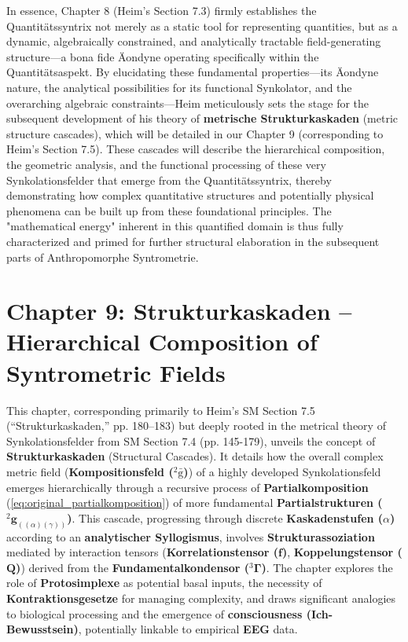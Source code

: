 \documentclass[12pt]{article}
\newcommand{\q}[1]{\enquote{#1}}
\newcommand{\kompositionsfeld}{{}^2\bar{\mathrm{g}}}
\newcommand{\partialstruktur}[1]{{}^2\mathbf{g}_{(#1)}}
\newcommand{\fundamentalkondensor}{{}^3\bm{\Gamma}}
\newcommand{\korrelationstensor}{\mathbf{f}}
\newcommand{\koppelungstensor}{\mathbf{Q}}
\newcommand{\kaskadenstufe}{\alpha}
\begin{document}
In essence, Chapter 8 (Heim's Section 7.3) firmly establishes the Quantitätssyntrix not merely as a static tool for representing quantities, but as a dynamic, algebraically constrained, and analytically tractable field-generating structure—a bona fide Äondyne operating specifically within the Quantitätsaspekt. By elucidating these fundamental properties—its Äondyne nature, the analytical possibilities for its functional Synkolator, and the overarching algebraic constraints—Heim meticulously sets the stage for the subsequent development of his theory of \textbf{metrische Strukturkaskaden} (metric structure cascades), which will be detailed in our Chapter 9 (corresponding to Heim's Section 7.5). These cascades will describe the hierarchical composition, the geometric analysis, and the functional processing of these very Synkolationsfelder that emerge from the Quantitätssyntrix, thereby demonstrating how complex quantitative structures and potentially physical phenomena can be built up from these foundational principles. The "mathematical energy" inherent in this quantified domain is thus fully characterized and primed for further structural elaboration in the subsequent parts of Anthropomorphe Syntrometrie.

\clearpage 
\section{Chapter 9: Strukturkaskaden – Hierarchical Composition of Syntrometric Fields}
\label{sec:chapter9}

This chapter, corresponding primarily to Heim's SM Section 7.5 (\q{Strukturkaskaden,} pp. 180–183) but deeply rooted in the metrical theory of Synkolationsfelder from SM Section 7.4 (pp. 145-179), unveils the concept of \textbf{Strukturkaskaden} (Structural Cascades). It details how the overall complex metric field (\textbf{Kompositionsfeld (\(\kompositionsfeld\))}) of a highly developed Synkolationsfeld emerges hierarchically through a recursive process of \textbf{Partialkomposition} (\eqref{eq:original_partialkomposition}) of more fundamental \textbf{Partialstrukturen (\(\partialstruktur{(\alpha)(\gamma)}\))}. This cascade, progressing through discrete \textbf{Kaskadenstufen (\(\kaskadenstufe\))} according to an \textbf{analytischer Syllogismus}, involves \textbf{Strukturassoziation} mediated by interaction tensors (\textbf{Korrelationstensor (\(\korrelationstensor\))}, \textbf{Koppelungstensor (\(\koppelungstensor\))}) derived from the \textbf{Fundamentalkondensor (\(\fundamentalkondensor\))}. The chapter explores the role of \textbf{Protosimplexe} as potential basal inputs, the necessity of \textbf{Kontraktionsgesetze} for managing complexity, and draws significant analogies to biological processing and the emergence of \textbf{consciousness (Ich-Bewusstsein)}, potentially linkable to empirical \textbf{EEG} data.
\end{document}
